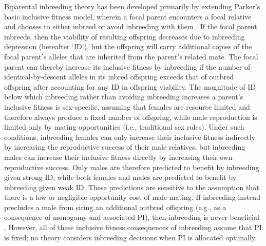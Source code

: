 \documentclass[12pt]{article}
\begin{document}
Biparental inbreeding theory has been developed primarily by extending Parker's \citeyearpar{Parker1979} basic inclusive fitness model, wherein a focal parent encounters a focal relative and chooses to either inbreed or avoid inbreeding with them \cite[e.g.,][]{Parker1979, Parker2006, Kokko2006, Duthie2015a}. If the focal parent inbreeds, then the viability of resulting offspring decreases due to inbreeding depression (hereafter `ID'), but the offspring will carry additional copies of the focal parent's alleles that are inherited from the parent's related mate. The focal parent can thereby increase its inclusive fitness by inbreeding if the number of identical-by-descent alleles in its inbred offspring exceeds that of outbred offspring after accounting for any ID in offspring viability. The magnitude of ID below which inbreeding rather than avoiding inbreeding increases a parent's inclusive fitness is sex-specific, assuming that females are resource limited and therefore always produce a fixed number of offspring, while male reproduction is limited only by mating opportunities (i.e., traditional sex roles). Under such conditions, inbreeding females can only increase their inclusive fitness indirectly by increasing the reproductive success of their male relatives, but inbreeding males can increase their inclusive fitness directly by increasing their own reproductive success. Only males are therefore predicted to benefit by inbreeding given strong ID, while both females and males are predicted to benefit by inbreeding given weak ID. These predictions are sensitive to the assumption that there is a low or negligible opportunity cost of male mating. If inbreeding instead precludes a male from siring an additional outbred offspring (e.g., as a consequence of monogamy and associated PI), then inbreeding is never beneficial \cite[][]{Waser1986}. However, all of these inclusive fitness consequences of inbreeding assume that PI is fixed; no theory considers inbreeding decisions when PI is allocated optimally. %
\end{document}
